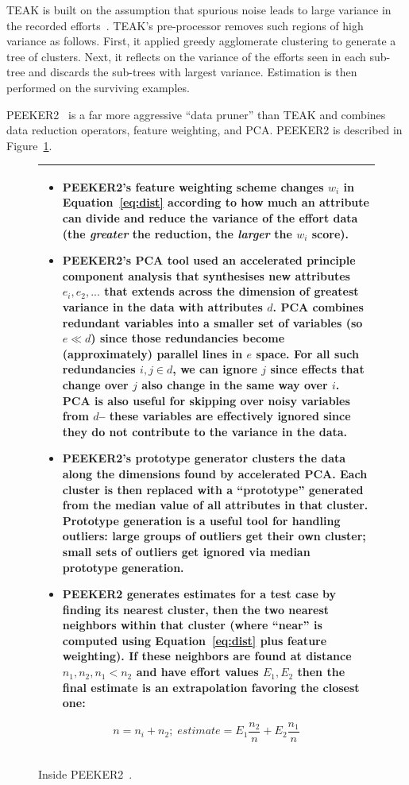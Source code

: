 \documentclass{sig-alternate}
\newcommand{\bi}{\begin{itemize}[leftmargin=0.4cm]}
\newcommand{\ei}{\end{itemize}}
\newcommand{\fig}[1]{Figure~\ref{fig:#1}}
\newcommand{\eq}[1]{Equation~\ref{eq:#1}}
\newenvironment{changed}{\par\color{MyDarkBlue}}{\par}
\begin{document}
\begin{changed}
TEAK is built
on the assumption that spurious noise leads to large variance in the recorded efforts~\cite{koc11b}.
TEAK's pre-processor removes such regions of high variance as follows.
First, it  applied greedy agglomerate clustering  to generate a tree of clusters.
Next, it reflects on the variance
of the efforts seen in each sub-tree and discards the sub-trees with largest variance. Estimation is then performed
on the surviving examples.

PEEKER2~\cite{papa13} is a far more aggressive ``data pruner'' than TEAK and combines   data reduction operators, 
feature weighting,  and PCA. PEEKER2 is described in  \fig{peeker}.
\end{changed}


\begin{figure}[!t]
\small
\begin{tabular}{|p{.95\linewidth}|}\hline
\bi
\item
PEEKER2's feature weighting scheme changes  $w_i$ in \eq{dist}  according to how much an attribute
can divide and reduce the variance of the effort data (the {\em greater} the reduction, the
{\em larger} the $w_i$ score).  
\item
PEEKER2's PCA tool used an accelerated   principle component analysis that synthesises  new
attributes $e_i, e_2,...$
that extends across the dimension of greatest  variance in the data  with attributes $d$.  
PCA  combines
redundant  variables into a smaller set of variables  (so $e \ll d$) since those
redundancies become (approximately) parallel lines
in $e$ space. For all such redundancies \mbox{$i,j \in d$}, we 
can ignore $j$ 
since effects that change over $j$ also
change in the same way over $i$.
PCA is also useful for skipping over noisy variables from $d$-- these
variables are effectively ignored since    they  do not contribute to the variance in the data.
\item
PEEKER2's prototype generator  clusters the data along the dimensions
found by accelerated PCA. Each cluster is then replaced with a ``prototype'' generated from
the median value of all attributes in that cluster. Prototype generation is a useful tool for
handling outliers: large groups of outliers get their own cluster; small sets of outliers
get ignored via median prototype generation.
\item
PEEKER2 generates estimates for a test case by finding its nearest cluster,
then the two nearest neighbors within that cluster  (where ``near''
is computed using \eq{dist} plus feature weighting). If these neighbors are found at distance
$n_1,n_2, n_1 < n_2$ and have effort values $E_1,E_2$ then the final estimate is an extrapolation
favoring the closest one:
\ei
\[
n=n_i+n_2;\;\mathit{estimate}=E_1\frac{n_2}{n} + E_2\frac{n_1}{n}
\]\\\hline
\end{tabular} 
\caption{Inside PEEKER2~\cite{papa13}.}\label{fig:peeker}
\end{figure}
\end{document}
